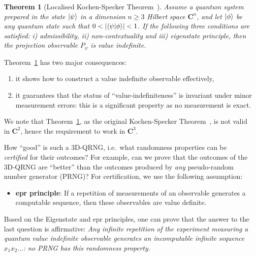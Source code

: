 \documentclass[l1pt]{elsarticle}
\newtheorem{theorem}{Theorem}
\begin{document}
{%


\begin{theorem}[Localised Kochen-Specker Theorem~\cite{Abbott:2010uq,acs-2015-info6040773,PhysRevLett.119.240501, aguero_trejo_new_2021}]
\label{EffecKS}
        Assume a quantum system prepared in the state
$\ket{\psi}$ in a dimension $n\ge 3$ Hilbert space ${\mathbf C}^n$, and let $\ket{\phi}$
be any quantum state such that  $0<\abs{\bra{\psi}\ket{\phi}}<1$. If the following three conditions are satisfied: i) admissibility, ii) non-contextuality and iii)
eigenstate principle,
then the projection observable $P_\psi$ is  value
indefinite.
\end{theorem}


Theorem~\ref{EffecKS}
has two major consequences:

\begin{enumerate}
    \item it shows how to construct a value indefinite observable effectively,
    \item it guarantees that the status of ``value-indefiniteness'' is invariant under minor measurement errors: this is a significant property as no measurement is exact.
\end{enumerate}


We note that Theorem~\ref{EffecKS}, as the original Kochen-Specker Theorem~\cite{Kochen:2017aa}, is not valid in ${\mathbf C}^2$, hence the requirement to work in ${\mathbf C}^3$.

How ``good'' is such a 3D-QRNG, i.e.~what randomness properties can be {\it certified} for their outcomes?  For example, can we prove that the outcomes of the 3D-QRNG are ``better'' than the outcomes produced by {\it any} pseudo-random number generator (PRNG)?
For certification, we use the following assumption:


\begin{itemize}
        \item  {\bf epr  principle}: If a repetition of measurements of an
observable generates a computable sequence, then  these observables
are value definite.
\end{itemize}


Based on  the  Eigenstate and epr    principles, one can prove that the answer to the last question is affirmative: {\it  Any infinite repetition of the
experiment
measuring a quantum value indefinite observable generates an
incomputable infinite sequence $x_1x_2\dots$: no PRNG has this randomness property.}


}
\end{document}
